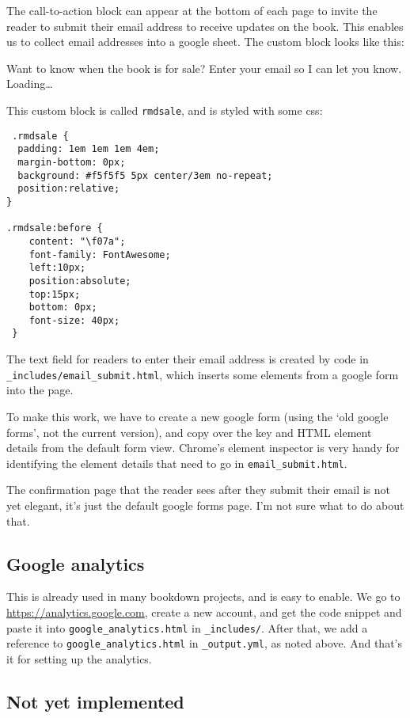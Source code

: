 \documentclass[]{book}
\let\BeginKnitrBlock\begin \let\EndKnitrBlock\end
\begin{document}
The call-to-action block can appear at the bottom of each page to invite
the reader to submit their email address to receive updates on the book.
This enables us to collect email addresses into a google sheet. The
custom block looks like this:

\BeginKnitrBlock{rmdsale}
Want to know when the book is for sale? Enter your email so I can let
you know. Loading\ldots{}
\EndKnitrBlock{rmdsale}

This custom block is called \texttt{rmdsale}, and is styled with some
css:

\begin{verbatim}
 .rmdsale {
  padding: 1em 1em 1em 4em;
  margin-bottom: 0px;
  background: #f5f5f5 5px center/3em no-repeat;
  position:relative;
}

.rmdsale:before {
    content: "\f07a";
    font-family: FontAwesome;
    left:10px;
    position:absolute;
    top:15px;
    bottom: 0px;
    font-size: 40px;
 }
\end{verbatim}

The text field for readers to enter their email address is created by
code in \texttt{\_includes/email\_submit.html}, which inserts some
elements from a google form into the page.

To make this work, we have to create a new google form (using the `old
google forms', not the current version), and copy over the key and HTML
element details from the default form view. Chrome's element inspector
is very handy for identifying the element details that need to go in
\texttt{email\_submit.html}.

The confirmation page that the reader sees after they submit their email
is not yet elegant, it's just the default google forms page. I'm not
sure what to do about that.

\subsection{Google analytics}\label{google-analytics}

This is already used in many bookdown projects, and is easy to enable.
We go to \url{https://analytics.google.com}, create a new account, and
get the code snippet and paste it into \texttt{google\_analytics.html}
in \texttt{\_includes/}. After that, we add a reference to
\texttt{google\_analytics.html} in \texttt{\_output.yml}, as noted
above. And that's it for setting up the analytics.

\subsection{Not yet implemented}\label{not-yet-implemented}
\end{document}
